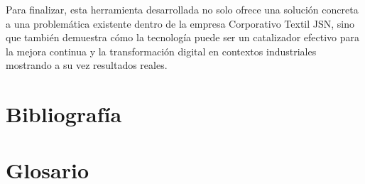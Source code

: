 \documentclass[12pt,letterpaper,spanish]{report}
\begin{document}
Para finalizar, esta herramienta desarrollada no solo ofrece una solución concreta a una problemática existente dentro de la empresa Corporativo Textil JSN, sino que también demuestra cómo la tecnología puede ser un catalizador efectivo para la mejora continua y la transformación digital en contextos industriales mostrando a su vez resultados reales.

\newpage

\appendix 

\nocite{book}
\nocite{dura2022saas}
\nocite{pretell2024mejora}
\nocite{odooDocs}
\nocite{book}

%
%

\chapter{Bibliografía}
\renewcommand{\bibname}{}





\chapter{Glosario}

\end{document}
